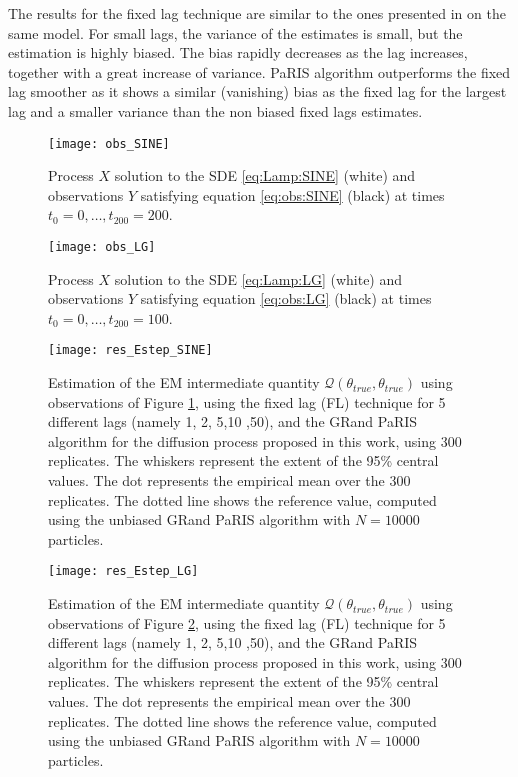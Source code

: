 \documentclass[12pt]{article}
\newcommand{\1}{\mathrm{1}}
\begin{document}
The results for the fixed lag technique are similar to the ones presented in \cite[Figure 1]{olsson:strojby:2011} on the same model. For small lags, the variance of the estimates is small, but the estimation is highly biased. The bias rapidly decreases as the lag increases, together with a  great increase of variance.  PaRIS algorithm outperforms the fixed lag smoother as it shows  a similar (vanishing) bias as the fixed lag for the largest lag and a smaller variance than the non biased fixed lags estimates. 
\begin{figure}[p]
\centering
\texttt{[image: obs\_SINE]}
\caption{Process $X$ solution to the SDE \eqref{eq:Lamp:SINE} (white) and observations $Y$ satisfying equation \eqref{eq:obs:SINE} (black) at times $t_0=0,\dots,t_{200}=200$.}
\label{fig:obs:SINE}
\end{figure}
\begin{figure}[p]
\centering
\texttt{[image: obs\_LG]}
\caption{Process $X$ solution to the SDE \eqref{eq:Lamp:LG} (white) and observations $Y$ satisfying equation \eqref{eq:obs:LG}  (black) at times $t_0=0,\dots,t_{200}=100$.}
\label{fig:obs:LG}
\end{figure}
\begin{figure}[p]
\centering
\texttt{[image: res\_Estep\_SINE]}
\caption{Estimation of the EM intermediate quantity $\mathcal{Q}(\theta_{true},\theta_{true})$ using observations of Figure \ref{fig:obs:SINE}, using the fixed lag (FL) technique for 5 different lags (namely 1, 2, 5,10 ,50), and the GRand PaRIS algorithm for the diffusion process proposed in this work, using 300 replicates. The whiskers represent the extent of the 95\% central values. The dot represents the empirical mean over the 300 replicates. The dotted line shows the reference value, computed using the unbiased GRand PaRIS algorithm with $N=10000$ particles.}
\label{fig:res:SINE}
\end{figure}
\begin{figure}[p]
\centering
\texttt{[image: res\_Estep\_LG]}
\caption{Estimation of the EM intermediate quantity $\mathcal{Q}(\theta_{true},\theta_{true})$ using observations of Figure \ref{fig:obs:LG}, using the fixed lag (FL) technique for 5 different lags (namely 1, 2, 5,10 ,50), and the GRand PaRIS algorithm for the diffusion process proposed in this work, using 300 replicates. The whiskers represent the extent of the 95\% central values. The dot represents the empirical mean over the 300 replicates. The dotted line shows the reference value, computed using the unbiased GRand PaRIS algorithm with $N=10000$ particles.}
\label{fig:res:LG}
\end{figure}
\end{document}

